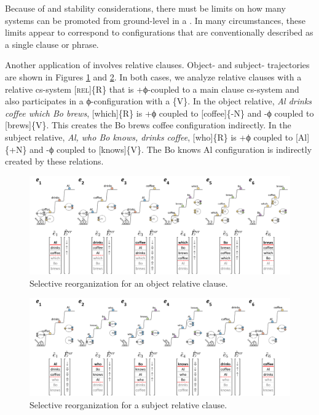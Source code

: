   Because of  and stability considerations, there must be limits on how many systems can be promoted from ground-level in a . In many circumstances, these limits appear to correspond to configurations that are conventionally described as a single clause or  phrase.

  Another application of  involves relative clauses. Object- and subject- trajectories are shown in Figures {\ref{fig:4:52}} and {\ref{fig:4:53}}. In both cases, we analyze relative clauses with a relative cs-system [\textsc{rel}]\{R\} that is +ϕ-coupled to a main clause cs-system and also participates in a ϕ-configuration with a  \{V\}. In the object relative, \textit{Al drinks coffee which Bo brews}, [which]\{R\} is +ϕ coupled to [coffee]\{-N\} and -ϕ coupled to [brews]\{V\}. This creates the {\textbar}Bo brews coffee{\textbar} configuration indirectly. In the subject relative, \textit{Al, who Bo knows, drinks coffee}, [who]\{R\} is +ϕ coupled to [Al]\{+N\} and -ϕ coupled to [knows]\{V\}. The {\textbar}Bo knows Al{\textbar} configuration is indirectly created by these relations.

  
\begin{figure}
\includegraphics[width=\textwidth]{figures/Tilsen-img102.png}
\caption{Selective reorganization for an object relative clause.}
\label{fig:4:52}
\end{figure}
 

  
\begin{figure}
\includegraphics[width=\textwidth]{figures/Tilsen-img103.png}
\caption{Selective reorganization for a subject relative clause.}
\label{fig:4:53}
\end{figure}
 

